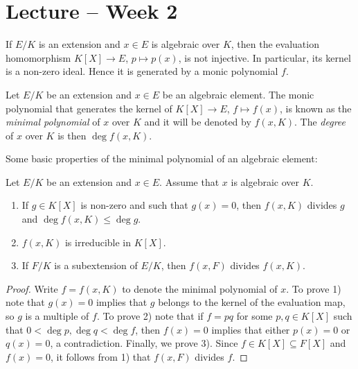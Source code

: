 \section{Lecture -- Week 2}

If $E/K$ is an extension and $x\in E$ is algebraic
over $K$, then the evaluation homomorphism 
$K[X]\to E$, $p\mapsto p(x)$, is not injective. In particular,
its kernel is a non-zero ideal. Hence 
it is generated by a monic polynomial $f$. 

\begin{definition}
	Let $E/K$ be an extension and $x\in E$ be an algebraic element.  The monic
	polynomial that generates the kernel of $K[X]\to E$, $f\mapsto f(x)$, is
	known as the \emph{minimal polynomial} of $x$ over $K$ and it will be
	denoted by $f(x,K)$. The \emph{degree} of $x$ over $K$ is then $\deg
	f(x,K)$. 
\end{definition}

Some basic properties of the minimal polynomial of an algebraic element:

\begin{proposition}
	Let $E/K$ be an extension and $x\in E$. Assume that $x$ is algebraic over $K$. 
	\begin{enumerate}
		\item If $g\in K[X]$ is non-zero and such that $g(x)=0$, then $f(x,K)$ divides $g$ and  
		$\deg f(x,K)\leq\deg g$. 
		\item $f(x,K)$ is irreducible in $K[X]$.
		\item If $F/K$ is a subextension of $E/K$, then $f(x,F)$ divides
			$f(x,K)$. 
	\end{enumerate}
\end{proposition}

\begin{proof}
	Write $f=f(x,K)$ to denote the minimal polynomial of $x$. 
	To prove 1) note that $g(x)=0$ implies that	$g$ belongs to the kernel of
	the evaluation map, so $g$ is a multiple of $f$. To prove 2) 
	note that if $f=pq$ for some $p,q\in K[X]$ such that
	$0<\deg p,\deg q<\deg f$, then $f(x)=0$ implies that 
	either $p(x)=0$ or $q(x)=0$, a
	contradiction. Finally, we prove 3). Since $f\in K[X]\subseteq F[X]$ 
	and $f(x)=0$, it follows from 1) that $f(x,F)$ divides $f$. 
\end{proof}

